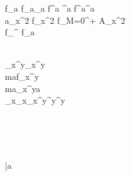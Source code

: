 
f_a {f_a}_a f^a ^a {f^a}^a \\

a_x^2 f_x^2 f_{M=0}^{+\infty} A_x^2 \\

f_{\overset{!}{=}}^{}
f_{}a

\\

\Gamma_x^y\Tau_x^y\\

{maf}_x^y\\
{ma\sum}_x^ya\\
\sum_{x_{x_x}}^{y^{y^y}}


\stackrel[a]{!}{=}\\
\stackrel[f]{!}{=}\\
\\


\imath\jmath\nabla\partial\epsilon\vartheta\phi
\varkappa\varrho\varpi


\bar{a}
\hat{,}\\
\\
\tilde{\accentset{\circ}{\phi}}


